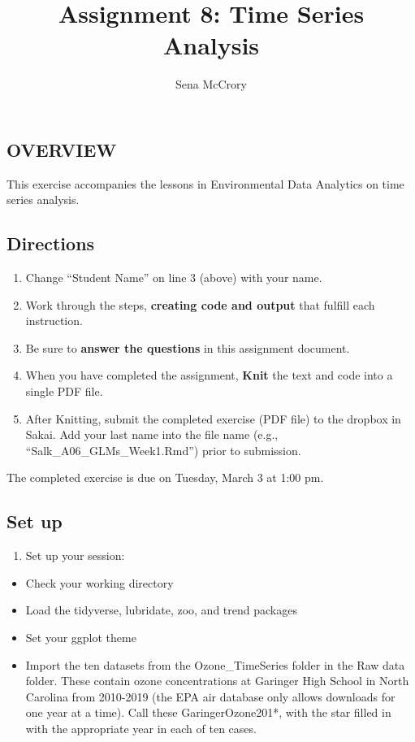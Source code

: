\documentclass[
]{article}
\title{Assignment 8: Time Series Analysis}
\author{Sena McCrory}
\date{}
\providecommand{\tightlist}{%
  \setlength{\itemsep}{0pt}\setlength{\parskip}{0pt}}
\begin{document}
\maketitle

\hypertarget{overview}{%
\subsection{OVERVIEW}\label{overview}}

This exercise accompanies the lessons in Environmental Data Analytics on
time series analysis.

\hypertarget{directions}{%
\subsection{Directions}\label{directions}}

\begin{enumerate}
\def\labelenumi{\arabic{enumi}.}
\tightlist
\item
  Change ``Student Name'' on line 3 (above) with your name.
\item
  Work through the steps, \textbf{creating code and output} that fulfill
  each instruction.
\item
  Be sure to \textbf{answer the questions} in this assignment document.
\item
  When you have completed the assignment, \textbf{Knit} the text and
  code into a single PDF file.
\item
  After Knitting, submit the completed exercise (PDF file) to the
  dropbox in Sakai. Add your last name into the file name (e.g.,
  ``Salk\_A06\_GLMs\_Week1.Rmd'') prior to submission.
\end{enumerate}

The completed exercise is due on Tuesday, March 3 at 1:00 pm.

\hypertarget{set-up}{%
\subsection{Set up}\label{set-up}}

\begin{enumerate}
\def\labelenumi{\arabic{enumi}.}
\tightlist
\item
  Set up your session:
\end{enumerate}

\begin{itemize}
\tightlist
\item
  Check your working directory
\item
  Load the tidyverse, lubridate, zoo, and trend packages
\item
  Set your ggplot theme
\item
  Import the ten datasets from the Ozone\_TimeSeries folder in the Raw
  data folder. These contain ozone concentrations at Garinger High
  School in North Carolina from 2010-2019 (the EPA air database only
  allows downloads for one year at a time). Call these
  GaringerOzone201*, with the star filled in with the appropriate year
  in each of ten cases.
\end{itemize}
\end{document}
